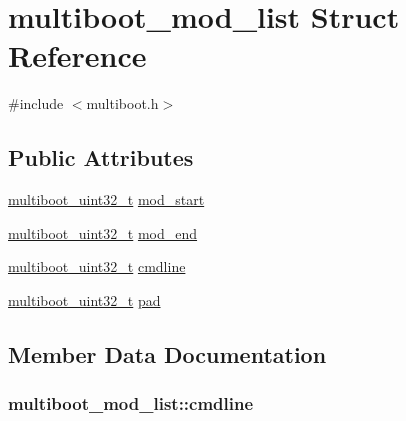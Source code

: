\hypertarget{structmultiboot__mod__list}{}\section{multiboot\+\_\+mod\+\_\+list Struct Reference}
\label{structmultiboot__mod__list}


{\ttfamily \#include $<$multiboot.\+h$>$}

\subsection*{Public Attributes}
\begin{DoxyCompactItemize}
\item 
\hyperlink{multiboot_8h_a009f355da41fed4badb8a52d432f5186}{multiboot\+\_\+uint32\+\_\+t} \hyperlink{structmultiboot__mod__list_afe0e2af1e8c0297c17a7771bd1a62e0f}{mod\+\_\+start}
\item 
\hyperlink{multiboot_8h_a009f355da41fed4badb8a52d432f5186}{multiboot\+\_\+uint32\+\_\+t} \hyperlink{structmultiboot__mod__list_a75b0899f1e1f90d4ff629b7136f5b988}{mod\+\_\+end}
\item 
\hyperlink{multiboot_8h_a009f355da41fed4badb8a52d432f5186}{multiboot\+\_\+uint32\+\_\+t} \hyperlink{structmultiboot__mod__list_a31365a9d2d0cae071f5cb8bddb9b33fb}{cmdline}
\item 
\hyperlink{multiboot_8h_a009f355da41fed4badb8a52d432f5186}{multiboot\+\_\+uint32\+\_\+t} \hyperlink{structmultiboot__mod__list_a63d98e6d313098a4d35b828e204a4e0c}{pad}
\end{DoxyCompactItemize}


\subsection{Member Data Documentation}
\hypertarget{structmultiboot__mod__list_a31365a9d2d0cae071f5cb8bddb9b33fb}{}
\subsubsection[{cmdline}]{ multiboot\+\_\+mod\+\_\+list\+::cmdline}\label{structmultiboot__mod__list_a31365a9d2d0cae071f5cb8bddb9b33fb}
\hypertarget{structmultiboot__mod__list_a75b0899f1e1f90d4ff629b7136f5b988}{}
